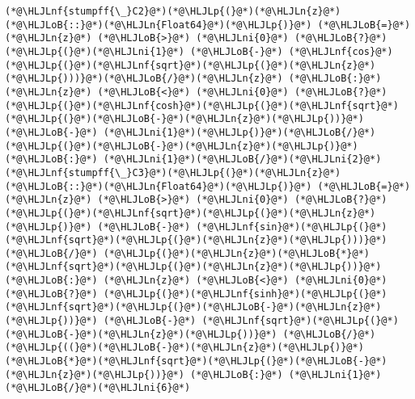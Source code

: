 \documentclass[12pt,a4paper]{article}
\newcommand{\HLJLn}[1]{#1}
\newcommand{\HLJLnf}[1]{\textcolor[RGB]{66,102,213}{#1}}
\newcommand{\HLJLni}[1]{\textcolor[RGB]{59,151,46}{#1}}
\newcommand{\HLJLoB}[1]{\textcolor[RGB]{102,102,102}{\textbf{#1}}}
\newcommand{\HLJLp}[1]{#1}
\begin{document}
\begin{lstlisting}
(*@\HLJLnf{stumpff{\_}C2}@*)(*@\HLJLp{(}@*)(*@\HLJLn{z}@*)(*@\HLJLoB{::}@*)(*@\HLJLn{Float64}@*)(*@\HLJLp{)}@*) (*@\HLJLoB{=}@*) (*@\HLJLn{z}@*) (*@\HLJLoB{>}@*) (*@\HLJLni{0}@*) (*@\HLJLoB{?}@*) (*@\HLJLp{(}@*)(*@\HLJLni{1}@*) (*@\HLJLoB{-}@*) (*@\HLJLnf{cos}@*)(*@\HLJLp{(}@*)(*@\HLJLnf{sqrt}@*)(*@\HLJLp{(}@*)(*@\HLJLn{z}@*)(*@\HLJLp{)))}@*)(*@\HLJLoB{/}@*)(*@\HLJLn{z}@*) (*@\HLJLoB{:}@*) (*@\HLJLn{z}@*) (*@\HLJLoB{<}@*) (*@\HLJLni{0}@*) (*@\HLJLoB{?}@*) (*@\HLJLp{(}@*)(*@\HLJLnf{cosh}@*)(*@\HLJLp{(}@*)(*@\HLJLnf{sqrt}@*)(*@\HLJLp{(}@*)(*@\HLJLoB{-}@*)(*@\HLJLn{z}@*)(*@\HLJLp{))}@*) (*@\HLJLoB{-}@*) (*@\HLJLni{1}@*)(*@\HLJLp{)}@*)(*@\HLJLoB{/}@*)(*@\HLJLp{(}@*)(*@\HLJLoB{-}@*)(*@\HLJLn{z}@*)(*@\HLJLp{)}@*) (*@\HLJLoB{:}@*) (*@\HLJLni{1}@*)(*@\HLJLoB{/}@*)(*@\HLJLni{2}@*)
(*@\HLJLnf{stumpff{\_}C3}@*)(*@\HLJLp{(}@*)(*@\HLJLn{z}@*)(*@\HLJLoB{::}@*)(*@\HLJLn{Float64}@*)(*@\HLJLp{)}@*) (*@\HLJLoB{=}@*) (*@\HLJLn{z}@*) (*@\HLJLoB{>}@*) (*@\HLJLni{0}@*) (*@\HLJLoB{?}@*) (*@\HLJLp{(}@*)(*@\HLJLnf{sqrt}@*)(*@\HLJLp{(}@*)(*@\HLJLn{z}@*)(*@\HLJLp{)}@*) (*@\HLJLoB{-}@*) (*@\HLJLnf{sin}@*)(*@\HLJLp{(}@*)(*@\HLJLnf{sqrt}@*)(*@\HLJLp{(}@*)(*@\HLJLn{z}@*)(*@\HLJLp{)))}@*) (*@\HLJLoB{/}@*) (*@\HLJLp{(}@*)(*@\HLJLn{z}@*)(*@\HLJLoB{*}@*)(*@\HLJLnf{sqrt}@*)(*@\HLJLp{(}@*)(*@\HLJLn{z}@*)(*@\HLJLp{))}@*) (*@\HLJLoB{:}@*) (*@\HLJLn{z}@*) (*@\HLJLoB{<}@*) (*@\HLJLni{0}@*) (*@\HLJLoB{?}@*) (*@\HLJLp{(}@*)(*@\HLJLnf{sinh}@*)(*@\HLJLp{(}@*)(*@\HLJLnf{sqrt}@*)(*@\HLJLp{(}@*)(*@\HLJLoB{-}@*)(*@\HLJLn{z}@*)(*@\HLJLp{))}@*) (*@\HLJLoB{-}@*) (*@\HLJLnf{sqrt}@*)(*@\HLJLp{(}@*)(*@\HLJLoB{-}@*)(*@\HLJLn{z}@*)(*@\HLJLp{))}@*) (*@\HLJLoB{/}@*) (*@\HLJLp{((}@*)(*@\HLJLoB{-}@*)(*@\HLJLn{z}@*)(*@\HLJLp{)}@*)(*@\HLJLoB{*}@*)(*@\HLJLnf{sqrt}@*)(*@\HLJLp{(}@*)(*@\HLJLoB{-}@*)(*@\HLJLn{z}@*)(*@\HLJLp{))}@*) (*@\HLJLoB{:}@*) (*@\HLJLni{1}@*)(*@\HLJLoB{/}@*)(*@\HLJLni{6}@*)


\end{lstlisting}
\end{document}
